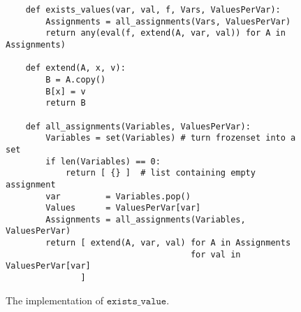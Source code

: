 \begin{figure}[!ht]
\centering
\begin{verbatim}
    def exists_values(var, val, f, Vars, ValuesPerVar):
        Assignments = all_assignments(Vars, ValuesPerVar)
        return any(eval(f, extend(A, var, val)) for A in Assignments)
    
    def extend(A, x, v):
        B = A.copy()
        B[x] = v
        return B
    
    def all_assignments(Variables, ValuesPerVar):
        Variables = set(Variables) # turn frozenset into a set
        if len(Variables) == 0:
            return [ {} ]  # list containing empty assignment
        var         = Variables.pop()
        Values      = ValuesPerVar[var]
        Assignments = all_assignments(Variables, ValuesPerVar)
        return [ extend(A, var, val) for A in Assignments 
                                     for val in ValuesPerVar[var]
               ]
\end{verbatim}
\vspace*{-0.3cm}
\caption{The implementation of $\texttt{exists\_value}$.}
\label{fig:Consistency-Solver.ipynb:exists_values}
\end{figure}

